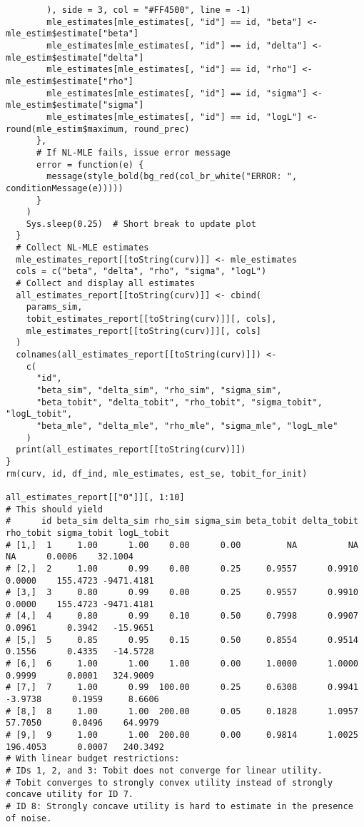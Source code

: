 \documentclass[12pt, a4paper, oneside]{article}
\theoremstyle{Plain}
\theoremstyle{Definition}
\theoremstyle{Remark}
\begin{document}
\begin{appendix}
\begin{lstlisting}
        ), side = 3, col = "#FF4500", line = -1)
        mle_estimates[mle_estimates[, "id"] == id, "beta"] <- mle_estim$estimate["beta"]
        mle_estimates[mle_estimates[, "id"] == id, "delta"] <- mle_estim$estimate["delta"]
        mle_estimates[mle_estimates[, "id"] == id, "rho"] <- mle_estim$estimate["rho"]
        mle_estimates[mle_estimates[, "id"] == id, "sigma"] <- mle_estim$estimate["sigma"]
        mle_estimates[mle_estimates[, "id"] == id, "logL"] <- round(mle_estim$maximum, round_prec)
      },
      # If NL-MLE fails, issue error message
      error = function(e) {
        message(style_bold(bg_red(col_br_white("ERROR: ", conditionMessage(e)))))
      }
    )
    Sys.sleep(0.25)  # Short break to update plot
  }
  # Collect NL-MLE estimates
  mle_estimates_report[[toString(curv)]] <- mle_estimates
  cols = c("beta", "delta", "rho", "sigma", "logL")
  # Collect and display all estimates
  all_estimates_report[[toString(curv)]] <- cbind(
    params_sim,
    tobit_estimates_report[[toString(curv)]][, cols],
    mle_estimates_report[[toString(curv)]][, cols]
  )
  colnames(all_estimates_report[[toString(curv)]]) <-
    c(
      "id",
      "beta_sim", "delta_sim", "rho_sim", "sigma_sim",
      "beta_tobit", "delta_tobit", "rho_tobit", "sigma_tobit", "logL_tobit",
      "beta_mle", "delta_mle", "rho_mle", "sigma_mle", "logL_mle"
    )
  print(all_estimates_report[[toString(curv)]])
}
rm(curv, id, df_ind, mle_estimates, est_se, tobit_for_init)

all_estimates_report[["0"]][, 1:10]
# This should yield
#      id beta_sim delta_sim rho_sim sigma_sim beta_tobit delta_tobit rho_tobit sigma_tobit logL_tobit
# [1,]  1     1.00      1.00    0.00      0.00         NA          NA        NA      0.0006    32.1004
# [2,]  2     1.00      0.99    0.00      0.25     0.9557      0.9910    0.0000    155.4723 -9471.4181
# [3,]  3     0.80      0.99    0.00      0.25     0.9557      0.9910    0.0000    155.4723 -9471.4181
# [4,]  4     0.80      0.99    0.10      0.50     0.7998      0.9907    0.0961      0.3942   -15.9651
# [5,]  5     0.85      0.95    0.15      0.50     0.8554      0.9514    0.1556      0.4335   -14.5728
# [6,]  6     1.00      1.00    1.00      0.00     1.0000      1.0000    0.9999      0.0001   324.9009
# [7,]  7     1.00      0.99  100.00      0.25     0.6308      0.9941   -3.9738      0.1959     8.6606
# [8,]  8     1.00      1.00  200.00      0.05     0.1828      1.0957   57.7050      0.0496    64.9979
# [9,]  9     1.00      1.00  200.00      0.00     0.9814      1.0025  196.4053      0.0007   240.3492
# With linear budget restrictions:
# IDs 1, 2, and 3: Tobit does not converge for linear utility.
# Tobit converges to strongly convex utility instead of strongly concave utility for ID 7.
# ID 8: Strongly concave utility is hard to estimate in the presence of noise.


\end{lstlisting}
\end{appendix}
\end{document}
